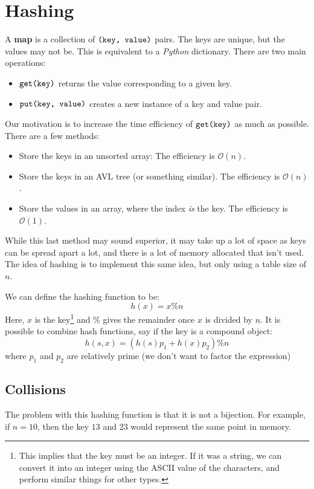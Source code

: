 \documentclass{article}
\begin{document}
    \section{Hashing}
    A \textbf{map} is a collection of $\verb#(key, value)#$ pairs. The keys are unique, but the values may not be. This is equivalent to a \textit{Python} dictionary. There are two main operations:
    \begin{itemize}
        \item $\verb#get(key)#$ returns the value corresponding to a given key.
        \item $\verb#put(key, value)#$ creates a new instance of a key and value pair.
    \end{itemize}
    Our motivation is to increase the time efficiency of $\verb#get(key)#$ as much as possible. There are a few methods:
    \begin{itemize}
        \item Store the keys in an unsorted array: The efficiency is $\mathcal{O}(n)$.
        \item Store the keys in an AVL tree (or something similar). The efficiency is $\mathcal{O}(n)$.
        \item Store the values in an array, where the index \textit{is} the key. The efficiency is $\mathcal{O}(1)$.
    \end{itemize}
    While this last method may sound superior, it may take up a lot of space as keys can be spread apart a lot, and there is a lot of memory allocated that isn't used. The idea of hashing is to implement this same idea, but only using a table size of $n$.
    \vspace{2mm}

    We can define the hashing function to be:
    \begin{equation}
        h(x) = x \% n
    \end{equation}
    Here, $x$ is the key\footnote{This implies that the key must be an integer. If it was a string, we can convert it into an integer using the ASCII value of the characters, and perform similar things for other types.} and $\%$ gives the remainder once $x$ is divided by $n$. It is possible to combine hash functions, say if the key is a compound object:
    \begin{equation}
        h(s,x) = (h(s)p_1 + h(x)p_2) \% n
    \end{equation}
    where $p_1$ and $p_2$ are relatively prime (we don't want to factor the expression)
    \subsection{Collisions}
    The problem with this hashing function is that it is not a bijection. For example, if $n=10$, then the key $13$ and $23$ would represent the same point in memory.
    
\end{document}
